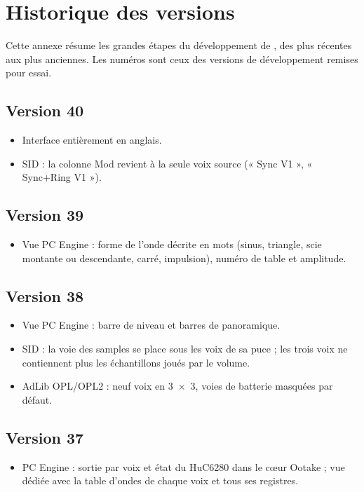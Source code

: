 \chapter{Historique des versions}
Cette annexe résume les grandes étapes du développement de \soft, des plus récentes aux plus anciennes. Les
numéros sont ceux des versions de développement remises pour essai.

\section*{Version 40}
\begin{itemize}
  \item Interface entièrement en anglais.
  \item SID : la colonne Mod revient à la seule voix source (« Sync V1 », « Sync+Ring V1 »).
\end{itemize}
\section*{Version 39}
\begin{itemize}
  \item Vue PC Engine : forme de l'onde décrite en mots (sinus, triangle, scie montante ou descendante, carré,
        impulsion), numéro de table et amplitude.
\end{itemize}
\section*{Version 38}
\begin{itemize}
  \item Vue PC Engine : barre de niveau et barres de panoramique.
  \item SID : la voie des samples se place sous les voix de sa puce ; les trois voix ne contiennent plus les
        échantillons joués par le volume.
  \item AdLib OPL/OPL2 : neuf voix en 3~$\times$~3, voies de batterie masquées par défaut.
\end{itemize}
\section*{Version 37}
\begin{itemize}
  \item PC Engine : sortie par voix et état du HuC6280 dans le cœur Ootake ; vue dédiée avec la table d'ondes de
        chaque voix et tous ses registres.
\end{itemize}
